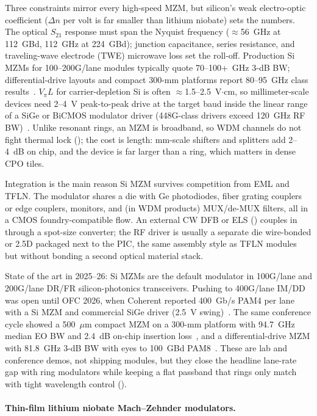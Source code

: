 Three constraints mirror every high-speed MZM, but silicon's weak electro-optic
coefficient ($\Delta n$ per volt is far smaller than lithium niobate) sets the
numbers. The optical $S_{21}$ response must span the Nyquist frequency
($\approx$56~GHz at 112~GBd, 112~GHz at 224~GBd); junction capacitance, series
resistance, and traveling-wave electrode (TWE) microwave loss set the roll-off.
Production Si MZMs for 100--200G/lane modules typically quote 70--100+~GHz 3-dB
BW; differential-drive layouts and compact 300-mm platforms report 80--95~GHz
class results~. $V_\pi L$ for carrier-depletion
Si is often $\approx$1.5--2.5~V$\cdot$cm, so millimeter-scale devices need
2--4~V peak-to-peak drive at the target baud inside the linear range of a SiGe
or BiCMOS modulator driver (448G-class drivers exceed 120~GHz RF
BW)~. Unlike resonant rings, an MZM is broadband, so WDM
channels do not fight thermal lock (); the cost is length:
mm-scale shifters and splitters add 2--4~dB on chip, and the device is far larger
than a ring, which matters in dense CPO tiles.

Integration is the main reason Si MZM survives competition from EML and TFLN.
The modulator shares a die with Ge photodiodes, fiber grating couplers or edge
couplers, monitors, and (in WDM products) MUX/de-MUX filters, all in a CMOS
foundry-compatible flow. An external CW DFB or ELS () couples in
through a spot-size converter; the RF driver is usually a separate die wire-bonded
or 2.5D packaged next to the PIC, the same assembly style as TFLN modules but
without bonding a second optical material stack.

State of the art in 2025--26: Si MZMs are the default modulator in 100G/lane and
200G/lane DR/FR silicon-photonics transceivers. Pushing to 400G/lane IM/DD was open
until OFC 2026, when Coherent reported 400~Gb/s PAM4 per lane with a Si MZM and
commercial SiGe driver (2.5~V swing)~. The same conference
cycle showed a 500~$\mu$m compact MZM on a 300-mm platform with 94.7~GHz median EO
BW and 2.4~dB on-chip insertion loss~, and a
differential-drive MZM with 81.8~GHz 3-dB BW with eyes to 100~GBd
PAM8~. These are lab and conference demos, not shipping
modules, but they close the headline lane-rate gap with ring modulators while
keeping a flat passband that rings only match with tight wavelength control
().

\paragraph{Thin-film lithium niobate Mach--Zehnder modulators.}
\label{sec:tfln-mzm}

